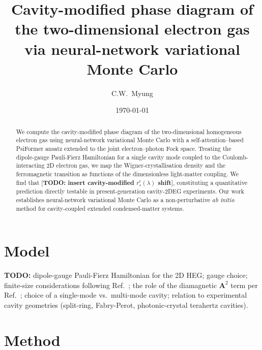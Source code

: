 \documentclass[aps,prl,reprint,superscriptaddress,longbibliography]{revtex4-2}
\begin{document}
\title{Cavity-modified phase diagram of the two-dimensional electron
gas via neural-network variational Monte Carlo}

\author{C.W.\ Myung}

\date{\today}

\begin{abstract}
We compute the cavity-modified phase diagram of the two-dimensional
homogeneous electron gas using neural-network variational Monte Carlo
with a self-attention–based PsiFormer ansatz extended to the joint
electron–photon Fock space. Treating the dipole-gauge Pauli-Fierz
Hamiltonian for a single cavity mode coupled to the Coulomb-interacting
2D electron gas, we map the Wigner-crystallisation density and the
ferromagnetic transition as functions of the dimensionless light-matter
coupling. We find that
[\textbf{TODO: insert cavity-modified $r_s^c(\lambda)$ shift}],
constituting a quantitative prediction directly testable in
present-generation cavity-2DEG experiments. Our work establishes
neural-network variational Monte Carlo as a non-perturbative
\emph{ab initio} method for cavity-coupled extended condensed-matter
systems.
\end{abstract}

\maketitle



\section{Model}\label{sec:model}

\textbf{TODO:} dipole-gauge Pauli-Fierz Hamiltonian for the 2D HEG;
gauge choice; finite-size considerations following
Ref.~\cite{Weber2025}; the role of the diamagnetic $\bm A^2$ term per
Ref.~\cite{Rokaj2022}; choice of a single-mode vs.\ multi-mode cavity;
relation to experimental cavity geometries (split-ring, Fabry-Perot,
photonic-crystal terahertz cavities).

\section{Method}\label{sec:method}
\end{document}
